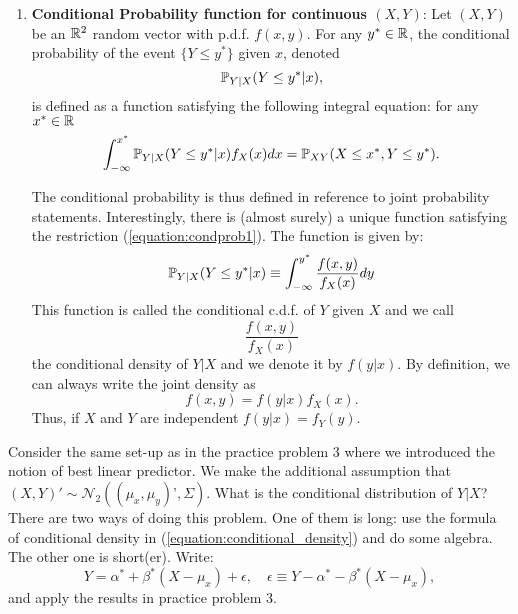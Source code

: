 \documentclass[11pt]{article} %
\begin{document}
\begin{enumerate}
\item  \textbf{Conditional Probability function for continuous $(X, Y)$}:  Let $(X,Y)$ be an $\mathbb{R}^2$ random vector with p.d.f. $f(x,y)$. For any $y^* \in \mathbb{R}$, the conditional probability of the event $\{Y \leq y^*\}$ given $x$, denoted
$$\mathbb{P}_{Y | X}(Y \leq y^* | x),$$ 
\noindent is defined as a function satisfying the following integral equation: for any $x^* \in \mathbb{R}$
\begin{equation} \label{equation:condprob1}
\int_{-\infty}^{x^*} \mathbb{P}_{Y | X}( Y  \leq y^* | x) f_{X}(x) d x =\mathbb{P}_{XY}(X \leq x^*, Y \leq y^*). \end{equation}

The conditional probability is thus defined in reference to joint probability statements. Interestingly, there is (almost surely) a unique function satisfying the restriction (\ref{equation:condprob1}). The function is given by:
\begin{equation} \label{equation:conditional_cdf}
\mathbb{P}_{Y | X}(Y \leq y^* | x) \equiv \int_{-\infty}^{y^*} \frac{f(x,y)}{f_{X}(x)} dy 
\end{equation}
\noindent This function is called the conditional c.d.f. of $Y$ given $X$ and we call
\begin{equation} \label{equation:conditional_density}
\frac{f(x,y)}{f_{X}(x)}
\end{equation}
the conditional density of $Y | X$ and we denote it by $f(y|x)$. By definition, we can always write the joint density as
\[ f(x,y) = f(y|x) f_{X}(x). \] 
Thus, if $X$ and $Y$ are independent $f(y|x) = f_Y(y)$. 

\end{enumerate}

\begin{prproblem}
Consider the same set-up as in the practice problem 3 where we introduced the notion of best linear predictor. We make the additional assumption that $(X,Y)' \sim \mathcal{N}_2((\mu_x, \mu_y)’, \Sigma)$. What is the conditional distribution of $Y | X$? \\

 There are two ways of doing this problem. One of them is long: use the formula of conditional density in (\ref{equation:conditional_density}) and do some algebra. The other one is short(er). Write:
\[  Y = \alpha^* + \beta^*(X-\mu_x) + \epsilon, \quad \epsilon \equiv Y - \alpha^*-\beta^*(X-\mu_x), \]
and apply the results in practice problem 3. 
\end{prproblem}
\end{document}
